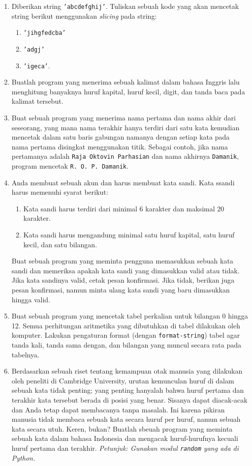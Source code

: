 \documentclass[14pt]{extarticle}
\begin{document}
\begin{enumerate}
	\item Diberikan string \texttt{'abcdefghij'}. Tuliskan sebuah kode yang akan mencetak string berikut menggunakan \emph{slicing} pada string:
	\begin{enumerate}
		\item \texttt{'jihgfedcba'}
		\item \texttt{'adgj'}
		\item \texttt{'igeca'}.
	\end{enumerate}
	\item Buatlah program yang menerima sebuah kalimat dalam bahasa Inggris lalu menghitung banyaknya huruf kapital, huruf kecil, digit, dan tanda baca pada kalimat tersebut.
	\item Buat sebuah program yang menerima nama pertama dan nama akhir dari seseorang, yang mana nama terakhir hanya terdiri dari satu kata kemudian mencetak dalam satu baris gabungan namanya dengan setiap kata pada nama pertama disingkat menggunakan titik. Sebagai contoh, jika nama pertamanya adalah \texttt{Raja Oktovin Parhasian} dan nama akhirnya \texttt{Damanik}, program mencetak \texttt{R. O. P. Damanik}.
	\item Anda membuat sebuah akun dan harus membuat kata sandi. Kata ssandi harus memenuhi syarat berikut:
	\begin{enumerate}
		\item Kata sandi harus terdiri dari minimal 6 karakter dan maksimal 20 karakter.
		\item Kata sandi harus mengandung minimal satu huruf kapital, satu huruf kecil, dan satu bilangan. 
	\end{enumerate}
	Buat sebuah program yang meminta pengguna memasukkan sebuah kata sandi dan memeriksa apakah kata sandi yang dimasukkan valid atau tidak. Jika kata sandinya valid, cetak pesan konfirmasi. Jika tidak, berikan juga pesan konfirmasi, namun minta ulang kata sandi yang baru dimasukkan hingga valid.
	\item Buat sebuah program yang mencetak tabel perkalian untuk bilangan 0 hingga 12. Semua perhitungan aritmetika yang dibutuhkan di tabel dilakukan oleh komputer. Lakukan pengaturan format (dengan \texttt{format-string}) tabel agar tanda kali, tanda sama dengan, dan bilangan yang muncul secara rata pada tabelnya.
	\item Berdasarkan sebuah riset tentang kemampuan otak manusia yang dilakukan oleh peneliti di Cambridge University, urutan kemunculan huruf di dalam sebuah kata tidak penting; yang penting hanyalah bahwa huruf pertama dan terakhir kata tersebut berada di posisi yang benar. Sisanya dapat diacak-acak dan Anda tetap dapat membacanya tanpa masalah. Ini karena pikiran manusia tidak membaca sebuah kata secara huruf per huruf, namun sebuah kata secara utuh. Keren, bukan? Buatlah sbeuah program yang meminta sebuah kata dalam bahasa Indonesia dan mengacak huruf-hurufnya kecuali huruf pertama dan terakhir. \emph{Petunjuk: Gunakan modul \texttt{random} yang ada di Python.}

\end{enumerate}
\end{document}

